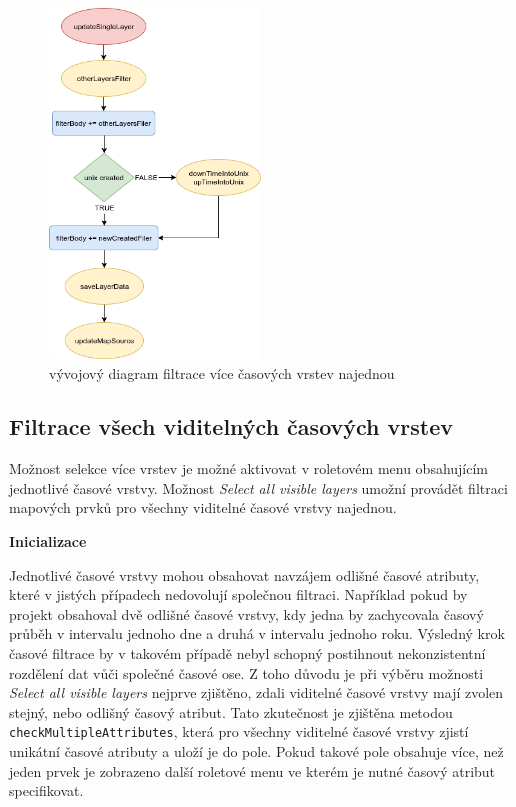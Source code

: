 \begin{figure}[h!]
	\centering
	\includegraphics[width=0.5\textwidth]{../img/getSingleLayer.png}
	\caption{vývojový diagram filtrace více časových vrstev najednou}
	\label{fig:single-chart}
\end{figure}

\subsection{Filtrace všech viditelných časových vrstev}

Možnost selekce více vrstev je možné aktivovat v roletovém menu obsahujícím jednotlivé časové vrstvy. Možnost \textit{Select all visible layers} umožní provádět filtraci mapových prvků pro všechny viditelné časové vrstvy najednou.

\bigskip
\noindent \textbf{Inicializace}

Jednotlivé časové vrstvy mohou obsahovat navzájem odlišné časové atributy, které v jistých případech nedovolují společnou filtraci. Například pokud by projekt obsahoval dvě odlišné časové vrstvy, kdy jedna by zachycovala časový průběh v intervalu jednoho dne a druhá v intervalu jednoho roku. Výsledný krok časové filtrace by v takovém případě nebyl schopný postihnout nekonzistentní rozdělení dat vůči společné časové ose. Z toho důvodu je při výběru možnosti \textit{Select all visible layers} nejprve zjištěno, zdali viditelné časové vrstvy mají zvolen stejný, nebo odlišný časový atribut. Tato zkutečnost je zjištěna metodou \verb|checkMultipleAttributes|, která pro všechny viditelné časové vrstvy zjistí unikátní časové atributy a uloží je do pole. Pokud takové pole obsahuje více, než jeden prvek je zobrazeno další roletové menu ve kterém je nutné časový atribut specifikovat.

